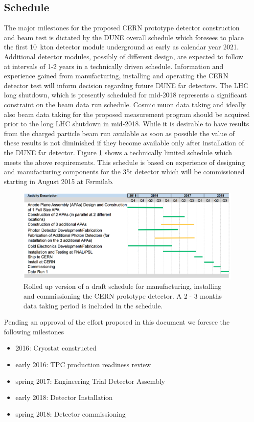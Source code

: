 \label{organ}

\subsection{Schedule}
The major milestones for the proposed CERN prototype detector construction and beam test is dictated by the DUNE overall schedule which foresees to place the first 10~kton detector module underground as early as calendar year 2021. Additional detector modules, possibly of different design, are expected to follow at intervals of 1-2 years in a technically driven schedule.
Information and experience gained from manufacturing, installing and operating the CERN detector test will inform decision regarding future DUNE far detectors.
The LHC long shutdown, which is presently scheduled for mid-2018 represents a significant constraint on the beam data run schedule.
Cosmic muon data taking and ideally also beam data taking for the proposed measurement program 
should be acquired prior to  the long LHC shutdown in mid-2018. 
While it is desirable to have results from the charged particle beam run available as soon as possible the value of these results is not diminished if they become available only after installation of the DUNE far detector.
Figure \ref{fig:schedule} shows a technically limited schedule which meets the above requirements.
This schedule is based on experience of designing and manufacturing components for the 35t detector which will be commissioned starting in August 2015 at  Fermilab.
%
\begin{figure}[htb]
  \centering
\includegraphics[scale=0.34]{figures/150514_CERN_test_sched.png}
  \caption{Rolled up version of a draft schedule for manufacturing, installing and commissioning the CERN prototype detector. A 2 - 3 months data taking period is included in the schedule. }
  \label{fig:schedule}
\end{figure}
%
Pending an approval of the effort proposed in this document we foresee the following milestones
\begin{itemize}
\item 2016: Cryostat constructed
\item early 2016: TPC production readiness review
\item spring 2017: Engineering Trial Detector Assembly
\item early 2018: Detector Installation
\item spring 2018: Detector commissioning 
\end{itemize}


